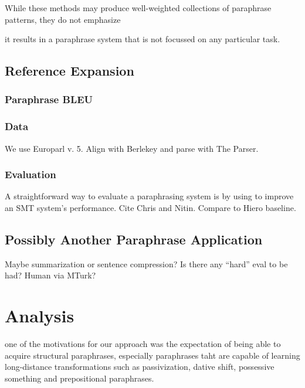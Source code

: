 \documentclass[11pt]{article}
\begin{document}
While these methods may produce well-weighted collections of
paraphrase patterns, they do not emphasize 

it results in a paraphrase system that is not
focussed on any particular task.



\subsection{Reference Expansion}



\subsubsection{Paraphrase BLEU} \label{pp_bleu}


\subsubsection{Data} \label{data}

We use Europarl v. 5. Align with Berlekey and parse with The Parser.

\subsubsection{Evaluation} \label{evaluation}

A straightforward way to evaluate a paraphrasing system is by using to
improve an SMT system's performance. Cite Chris and Nitin. Compare to
Hiero baseline.

\subsection{Possibly Another Paraphrase
  Application} \label{other_application}

Maybe summarization or sentence compression? Is there
any ``hard'' eval to be had? Human via MTurk?

\newpage

\section{Analysis} \label{analysis}

one of the motivations for our approach was the expectation of being
able to acquire structural paraphrases, especially paraphrases taht
are capable of learning long-distance transformations such as
passivization, dative shift, possessive something and prepositional
paraphrases.
\end{document}
